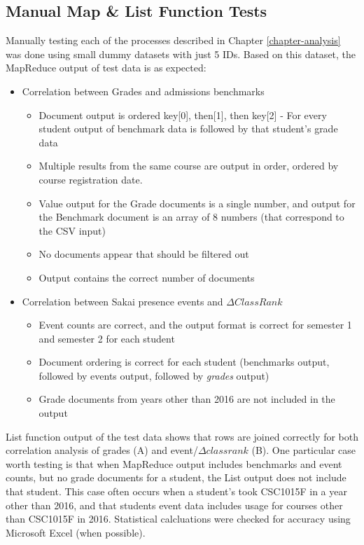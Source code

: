 \subsection{Manual Map \& List Function Tests}
Manually testing each of the processes described in Chapter \ref{chapter-analysis} was done using small dummy datasets with just 5 IDs. Based on this dataset, the MapReduce output of test data is as expected:

\begin{itemize}
  \item Correlation between Grades and admissions benchmarks
        \begin{itemize}
          \item Document output is ordered key[0], then[1], then key[2] - For every student output of benchmark data is followed by that student's grade data
          \item Multiple results from the same course are output in order, ordered by course registration date.
          \item Value output for the Grade documents is a single number, and output for the Benchmark document is an array of 8 numbers (that correspond to the CSV input)
          \item No documents appear that should be filtered out
          \item Output contains the correct number of documents
        \end{itemize}
  \item Correlation between Sakai presence events and $\Delta ClassRank$
        \begin{itemize}
          \item Event counts are correct, and the output format is correct for semester 1 and semester 2 for each student
          \item Document ordering is correct for each student (benchmarks output, followed by events output, followed by \textit{grades} output)
          \item Grade documents from years other than 2016 are not included in the output
        \end{itemize}
\end{itemize}

List function output of the test data shows that rows are joined correctly for both correlation analysis of grades (A) and event/$\Delta classrank$ (B). One particular case worth testing is that when MapReduce output includes benchmarks and event counts, but no grade documents for a student, the List output does not include that student. This case often occurs when a student's took CSC1015F in a year other than 2016, and that students event data includes usage for courses other than CSC1015F in 2016. Statistical calcluations were checked for accuracy using Microsoft Excel (when possible).